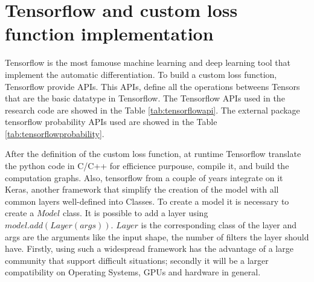 \documentclass[12pt]{report}
\begin{document}
\section{Tensorflow and custom loss function implementation}
Tensorflow is the most famouse machine learning and deep learning tool that implement the automatic differentiation.
To build a custom loss function, Tensorflow provide APIs. This APIs, define all the operations betweens Tensors that are the basic datatype in Tensorflow.
The Tensorflow APIs used in the research code are showed in the Table \ref{tab:tensorflowapi}.
The external package tensorflow probability APIs used are showed in the Table \ref{tab:tensorflowprobability}.

After the definition of the custom loss function, at runtime Tensorflow translate the python code in C/C++ for efficience purpouse, compile it, and build the computation graphs.
Also, tensorflow from a couple of years integrate on it Keras, another framework that simplify the creation of the model with 
all common layers well-defined into Classes.
To create a model it is necessary to create a $Model$ class.
It is possible to add a layer using $model.add(Layer(args))$.
$Layer$ is the corresponding class of the layer and args are the arguments like the input shape, the number of filters the layer should have. 
Firstly, using such a widespread framework has the advantage of a large community that support difficult situations;
secondly it will be a larger compatibility on Operating Systems, GPUs and hardware in general.


\end{document}
